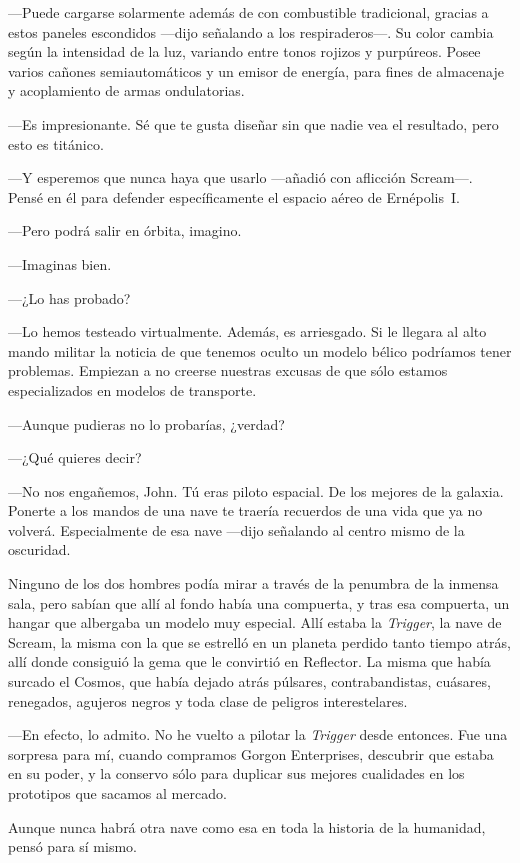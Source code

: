 ---Puede cargarse solarmente además de con combustible tradicional, gracias a estos paneles escondidos ---dijo señalando a los respiraderos---. Su color cambia según la intensidad de la luz, variando entre tonos rojizos y purpúreos. Posee varios cañones semiautomáticos y un emisor de energía, para fines de almacenaje y acoplamiento de armas ondulatorias.

---Es impresionante. Sé que te gusta diseñar sin que nadie vea el resultado, pero esto es titánico.

---Y esperemos que nunca haya que usarlo ---añadió con aflicción Scream---. Pensé en él para defender específicamente el espacio aéreo de Ernépolis~I.

---Pero podrá salir en órbita, imagino.

---Imaginas bien.

---¿Lo has probado?

---Lo hemos testeado virtualmente. Además, es arriesgado. Si le llegara al alto mando militar la noticia de que tenemos oculto un modelo bélico podríamos tener problemas. Empiezan a no creerse nuestras excusas de que sólo estamos especializados en modelos de transporte.

---Aunque pudieras no lo probarías, ¿verdad?

---¿Qué quieres decir?

---No nos engañemos, John. Tú eras piloto espacial. De los mejores de la galaxia. Ponerte a los mandos de una nave te traería recuerdos de una vida que ya no volverá. Especialmente de esa nave ---dijo señalando al centro mismo de la oscuridad.

Ninguno de los dos hombres podía mirar a través de la penumbra de la inmensa sala, pero sabían que allí al fondo había una compuerta, y tras esa compuerta, un hangar que albergaba un modelo muy especial. Allí estaba la \emph{Trigger}, la nave de Scream, la misma con la que se estrelló en un planeta perdido tanto tiempo atrás, allí donde consiguió la gema que le convirtió en Reflector. La misma que había surcado el Cosmos, que había dejado atrás púlsares, contrabandistas, cuásares, renegados, agujeros negros y toda clase de peligros interestelares.

---En efecto, lo admito. No he vuelto a pilotar la \emph{Trigger} desde entonces. Fue una sorpresa para mí, cuando compramos Gorgon Enterprises, descubrir que estaba en su poder, y la conservo sólo para duplicar sus mejores cualidades en los prototipos que sacamos al mercado.

Aunque nunca habrá otra nave como esa en toda la historia de la humanidad, pensó para sí mismo.

